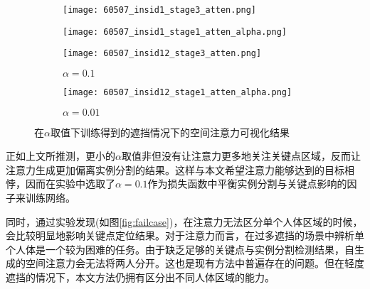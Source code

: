 \begin{figure}[h]
	\centering
	\begin{minipage}{\linewidth}
		\centering
		\begin{subfigure}{0.3\linewidth}
			\texttt{[image: 60507\_insid1\_stage3\_atten.png]}
		\end{subfigure}
		\begin{subfigure}{0.3\linewidth}
			\texttt{[image: 60507\_insid1\_stage1\_atten\_alpha.png]}
		\end{subfigure}
	\end{minipage}
	
	\vskip2pt
	\begin{minipage}{\linewidth}
		\centering
		\begin{subfigure}{0.3\linewidth}
			\texttt{[image: 60507\_insid12\_stage3\_atten.png]}
			\caption{$\alpha=0.1$}
		\end{subfigure}
		\begin{subfigure}{0.3\linewidth}
			\texttt{[image: 60507\_insid12\_stage1\_atten\_alpha.png]}
			\caption{$\alpha=0.01$}
		\end{subfigure}
	\end{minipage}
	\caption{在$\alpha$取值下训练得到的遮挡情况下的空间注意力可视化结果}
	\label{fig:attenalpha}
\end{figure}

正如上文所推测，更小的$\alpha$取值非但没有让注意力更多地关注关键点区域，反而让注意力生成更加偏离实例分割的结果。这样与本文希望注意力能够达到的目标相悖，因而在实验中选取了$\alpha=0.1$作为损失函数中平衡实例分割与关键点影响的因子来训练网络。

同时，通过实验发现(如图\ref{fig:failcase})，在注意力无法区分单个人体区域的时候，会比较明显地影响关键点定位结果。对于注意力而言，在过多遮挡的场景中辨析单个人体是一个较为困难的任务。由于缺乏足够的关键点与实例分割检测结果，自生成的空间注意力会无法将两人分开。这也是现有方法中普遍存在的问题。但在轻度遮挡的情况下，本文方法仍拥有区分出不同人体区域的能力。

